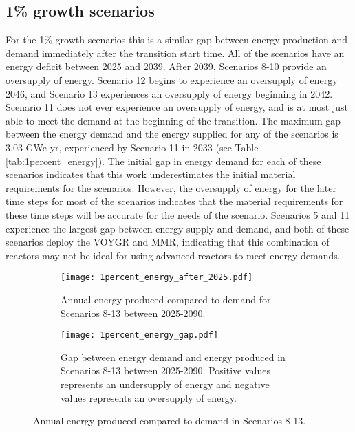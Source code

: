 \subsection{1\% growth scenarios}
For the 1\% growth scenarios this is a similar gap between energy 
production and 
demand immediately after the transition start time. All of the 
scenarios have an energy deficit between 2025 and 2039. After 2039, Scenarios
8-10 provide an oversupply of energy. Scenario 12 begins to experience 
an oversupply of energy 2046, and Scenario 13 experiences an oversupply 
of energy beginning in 2042. Scenario 11 does not ever experience an 
oversupply of energy, and is at most just able to meet the demand at the 
beginning of the transition. 
The maximum gap between the energy demand 
and the energy supplied for any of the scenarios is 3.03 GWe-yr, experienced 
by Scenario 11 in 2033 (see Table \ref{tab:1percent_energy}). The 
initial gap in energy demand for each of these scenarios indicates that
this work underestimates the initial material requirements for the 
scenarios. However, the 
oversupply of energy for the later time steps for most of the scenarios 
indicates that the material requirements for these time steps will be 
accurate for the needs of the scenario. Scenarios 5 and 11 experience the 
largest gap between energy supply and demand, and both of these scenarios 
deploy the VOYGR and \gls{MMR}, indicating that this combination of 
reactors may not be ideal for using advanced reactors to meet energy 
demands. 

\begin{figure}
    \centering
    \begin{subfigure}[b]{0.45\textwidth}
        \centering
        \texttt{[image: 1percent\_energy\_after\_2025.pdf]}
        \caption{Annual energy produced compared to demand for Scenarios 8-13
        between 2025-2090.}
        \label{fig:1percent_energy_after_2025}
    \end{subfigure}
    \hfill
    \begin{subfigure}[b]{0.45\textwidth}
        \centering
        \texttt{[image: 1percent\_energy\_gap.pdf]}
        \caption{Gap between energy demand and energy produced in Scenarios 8-13
        between 2025-2090. Positive values represents an undersupply of energy 
        and negative values represents an oversupply of energy. }
        \label{fig:1percent_energy_gap}
    \end{subfigure}
       \caption{Annual energy produced compared to demand in Scenarios 8-13.}
       \label{fig:1percent_energy}
\end{figure}

